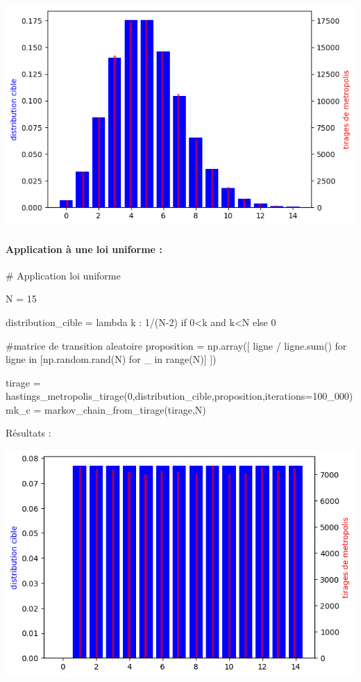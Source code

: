 \documentclass{article}
\begin{document}
\includegraphics[scale=0.5]{poisson.png}

\newpage
\paragraph{Application à une loi uniforme :}
\begin{center}
\begin{python}
# Application loi uniforme

N = 15

distribution_cible = lambda k : 1/(N-2) if 0<k and k<N else 0

#matrice de transition aleatoire
proposition = np.array([ ligne / ligne.sum()
    for ligne in [np.random.rand(N) for _ in range(N)]
])


tirage = hastings_metropolis_tirage(0,distribution_cible,proposition,iterations=100_000)
mk_c = markov_chain_from_tirage(tirage,N)
\end{python}
\end{center}
Résultats :

\includegraphics[scale=0.5]{uniforme.png}
\end{document}
